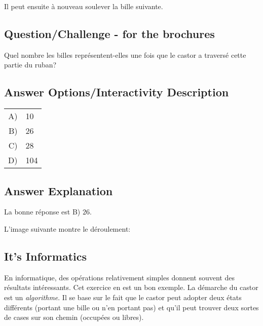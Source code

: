 \documentclass[a4paper,11pt]{report}
\newcommand{\taskGraphicsFolder}{..}
\begin{document}
Il peut ensuite à nouveau soulever la bille suivante.

{\em


\subsection*{Question/Challenge - for the brochures}

Quel nombre les billes représentent-elles une fois que le castor a traversé cette partie du ruban?

{\centering%
\par}

}

\begingroup
\renewcommand{\arraystretch}{1.5}
\subsection*{Answer Options/Interactivity Description}

\begin{tabularx}{\columnwidth}{ @{} r J @{} }
  A) & 10 \\ 
  B) & 26 \\ 
  C) & 28 \\ 
  D) & 104
\end{tabularx}

\endgroup

\subsection*{Answer Explanation}

La bonne réponse est B) $26$.

{\centering%
\par}

L’image suivante montre le déroulement:

{\centering%
\par}


\subsection*{It’s Informatics}

En informatique, des opérations relativement simples donnent souvent des résultats intéressants. Cet exercice en est un bon exemple. La démarche du castor est un \emph{algorithme}. Il se base sur le fait que le castor peut adopter deux états différents (portant une bille ou n’en portant pas) et qu’il peut trouver deux sortes de cases sur son chemin (occupées ou libres).
\end{document}
